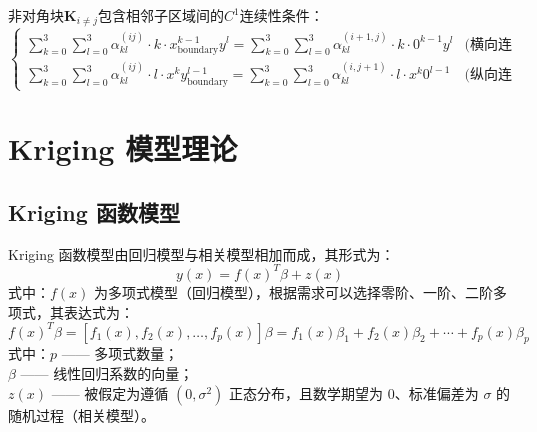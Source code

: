 非对角块$\mathbf{K}_{i\neq j}$包含相邻子区域间的$C^1$连续性条件：
\[
\begin{cases}
\sum_{k=0}^3\sum_{l=0}^3 \alpha_{kl}^{(ij)} \cdot k \cdot x_{\mathrm{boundary}}^{k-1} y^l = \sum_{k=0}^3\sum_{l=0}^3 \alpha_{kl}^{(i+1,j)} \cdot k \cdot 0^{k-1} y^l & \text{(横向连续性)} \\
\sum_{k=0}^3\sum_{l=0}^3 \alpha_{kl}^{(ij)} \cdot l \cdot x^k y_{\mathrm{boundary}}^{l-1} = \sum_{k=0}^3\sum_{l=0}^3 \alpha_{kl}^{(i,j+1)} \cdot l \cdot x^k 0^{l-1} & \text{(纵向连续性)}
\end{cases}
\]


\section{Kriging 模型理论}
\subsection{Kriging 函数模型}

Kriging 函数模型由回归模型与相关模型相加而成，其形式为：
\begin{equation}
    y(x) = f(x)^T \beta + z(x)
    \label{eq:2.1}
\end{equation}
式中：\( f(x) \) 为多项式模型（回归模型），根据需求可以选择零阶、一阶、二阶多项式，其表达式为：
\begin{equation}
    f(x)^T \beta = [f_1(x), f_2(x), \ldots, f_p(x)] \beta = f_1(x) \beta_1 + f_2(x) \beta_2 + \cdots + f_p(x) \beta_p
    \label{eq:2.2}
\end{equation}
式中：\( p \) —— 多项式数量；\\
\( \beta \) —— 线性回归系数的向量；\\
\( z(x) \) —— 被假定为遵循 \( (0, \sigma^2) \) 正态分布，且数学期望为 0、标准偏差为 \( \sigma \) 的随机过程（相关模型）。

